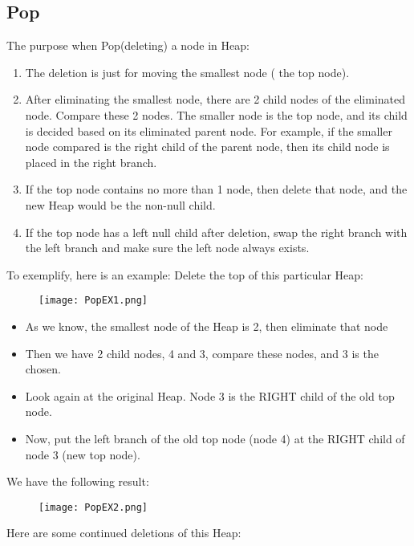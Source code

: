 \documentclass[12pt, a4paper]{article}
\begin{document}
\subsection{Pop}
The purpose when Pop(deleting) a node in Heap:
\begin{enumerate}
    \item The deletion is just for moving the smallest node ( the top node).
    \item After eliminating the smallest node, there are 2 child nodes of the eliminated node. Compare these 2 nodes. The smaller node is the top node, and its child is decided based on its eliminated parent node. For example, if the smaller node compared is the right child of the parent node, then its child node is placed in the right branch.
    \item If the top node contains no more than 1 node, then delete that node, and the new Heap would be the non-null child.
    \item If the top node has a left null child after deletion, swap the right branch with the left branch and make sure the left node always exists.
\end{enumerate}
To exemplify, here is an example:
Delete the top of this particular Heap:
\begin{figure}[H]
    \begin{center}
        \texttt{[image: PopEX1.png]}
    \end{center}
\end{figure}

\begin{itemize}
    \item As we know, the smallest node of the Heap is 2, then eliminate that node
    \item Then we have 2 child nodes, 4 and 3, compare these nodes, and 3 is the chosen.
    \item Look again at the original Heap. Node 3 is the RIGHT child of the old top node.
    \item Now, put the left branch of the old top node (node 4) at the RIGHT child of node 3 (new top node).
\end{itemize}
We have the following result:
\begin{figure}[H]
    \begin{center}
        \texttt{[image: PopEX2.png]}
    \end{center}
\end{figure}
Here are some continued deletions of this Heap:
\end{document}
